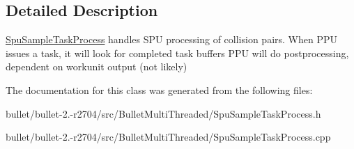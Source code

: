 \subsection{Detailed Description}
\hyperlink{class_spu_sample_task_process}{Spu\+Sample\+Task\+Process} handles S\+P\+U processing of collision pairs. When P\+P\+U issues a task, it will look for completed task buffers P\+P\+U will do postprocessing, dependent on workunit output (not likely) 

The documentation for this class was generated from the following files\+:\begin{DoxyCompactItemize}
\item 
bullet/bullet-\/2.-\/r2704/src/\+Bullet\+Multi\+Threaded/Spu\+Sample\+Task\+Process.\+h\item 
bullet/bullet-\/2.-\/r2704/src/\+Bullet\+Multi\+Threaded/Spu\+Sample\+Task\+Process.\+cpp\end{DoxyCompactItemize}
